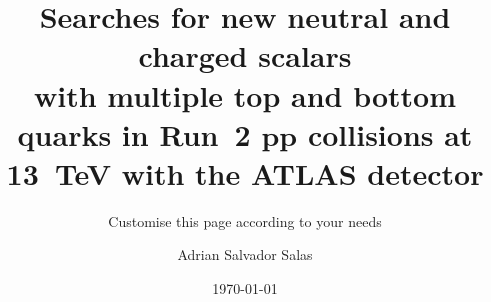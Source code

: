 \documentclass[
	a4paper, %
	fontsize=11pt, %
	twoside=true, %
	numbers=noenddot, %
]{kaobook}
\begin{document}



\title[Searches for new neutral and charged scalars with multiple top and bottom quarks in Run~2 $pp$ collisions at 13~TeV with the ATLAS detector]{Searches for new neutral and charged scalars \\ with multiple top and bottom quarks in Run~2 $\bm{pp}$ collisions at 13~TeV with the ATLAS detector}
\subtitle{Customise this page according to your needs}


\author[Adrian Salvador Salas]{Adrian Salvador Salas} %

\date{\today}

\publishers{An Awesome Publisher}



\frontmatter %




\makeatletter
\uppertitleback{\@titlehead} %
\end{document}
